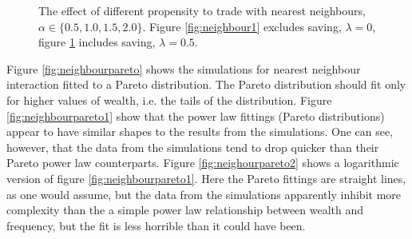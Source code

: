 \documentclass[10pt, a4paper]{amsart}
\begin{document}
\begin{figure}
\begin{subfigure}{.49\textwidth}
	\caption{}
	\label{fig:neighbour2}
\end{subfigure}
\caption{The effect of different propensity to trade with nearest neighbours, $\alpha\in\{0.5,1.0,1.5,2.0\}$. Figure \ref{fig:neighbour1} excludes saving, $\lambda = 0$, figure \ref{fig:neighbour2} includes saving, $\lambda = 0.5$.}
\label{fig:neighbour}
\end{figure}

Figure \ref{fig:neighbourpareto} shows the simulations for nearest neighbour interaction fitted to a Pareto distribution. The Pareto distribution should fit only for higher values of wealth, i.e. the tails of the distribution. Figure \ref{fig:neighbourpareto1} show that the power law fittings (Pareto distributions) appear to have similar shapes to the results from the simulations. One can see, however, that the data from the simulations tend to drop quicker than their Pareto power law counterparts. Figure \ref{fig:neighourpareto2} shows a logarithmic version of figure \ref{fig:neighbourpareto1}. Here the Pareto fittings are straight lines, as one would assume, but the data from the simulations apparently inhibit more complexity than the a simple power law relationship between wealth and frequency, but the fit is less horrible than it could have been.
\end{document}

